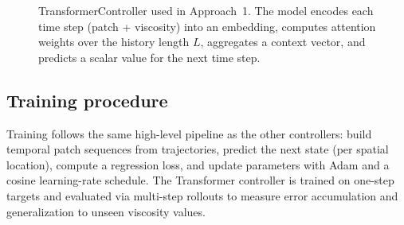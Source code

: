 \begin{figure}[H]
{%
}
\caption{TransformerController used in Approach~1. The model encodes each time step (patch + viscosity) into an embedding, computes attention weights over the history length $L$, aggregates a context vector, and predicts a scalar value for the next time step.}
\label{fig:transformer_controller_arch}
\end{figure}

\subsection{Training procedure}

Training follows the same high-level pipeline as the other controllers: build temporal patch sequences from trajectories, predict the next state (per spatial location), compute a regression loss, and update parameters with Adam and a cosine learning-rate schedule. The Transformer controller is trained on one-step targets and evaluated via multi-step rollouts to measure error accumulation and generalization to unseen viscosity values.

